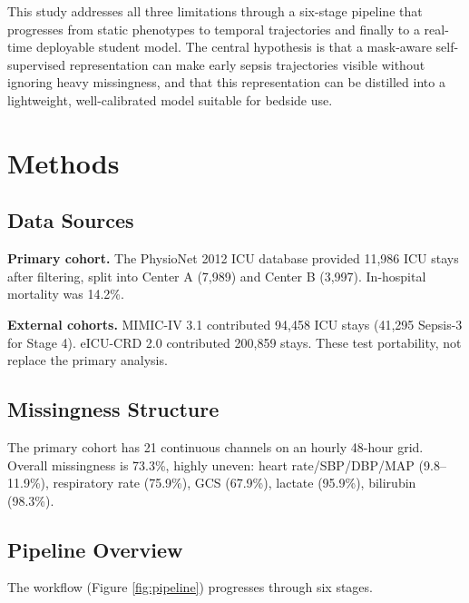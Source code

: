 \documentclass[11pt,a4paper]{article}
\begin{document}
This study addresses all three limitations through a six-stage pipeline that progresses from static phenotypes to temporal trajectories and finally to a real-time deployable student model. The central hypothesis is that a mask-aware self-supervised representation can make early sepsis trajectories visible without ignoring heavy missingness, and that this representation can be distilled into a lightweight, well-calibrated model suitable for bedside use.

\section{Methods}

\subsection{Data Sources}

\textbf{Primary cohort.} The PhysioNet 2012 ICU database \cite{silva2012} provided 11,986 ICU stays after filtering, split into Center A (7,989) and Center B (3,997). In-hospital mortality was 14.2\%.

\textbf{External cohorts.} MIMIC-IV 3.1 \cite{johnson2023} contributed 94,458 ICU stays (41,295 Sepsis-3 for Stage 4). eICU-CRD 2.0 \cite{pollard2018} contributed 200,859 stays. These test portability, not replace the primary analysis.

\subsection{Missingness Structure}

The primary cohort has 21 continuous channels on an hourly 48-hour grid. Overall missingness is 73.3\%, highly uneven: heart rate/SBP/DBP/MAP (9.8--11.9\%), respiratory rate (75.9\%), GCS (67.9\%), lactate (95.9\%), bilirubin (98.3\%).

\subsection{Pipeline Overview}

The workflow (Figure \ref{fig:pipeline}) progresses through six stages.
\end{document}
